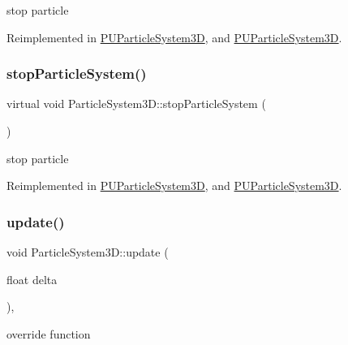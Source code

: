 stop particle 

Reimplemented in \hyperlink{classPUParticleSystem3D_a95eff5c73f4e750e34b0f1901bfdae3d}{P\+U\+Particle\+System3D}, and \hyperlink{classPUParticleSystem3D_a2fb2d3bfd5bc6b7b827e1800f34f0157}{P\+U\+Particle\+System3D}.

\mbox{\label{classParticleSystem3D_a93d4c960fa9d37cde714c482080dea4e}} 
\subsubsection{\texorpdfstring{stop\+Particle\+System()}{stopParticleSystem()}\hspace{0.1cm}{\footnotesize\ttfamily [2/2]}}
{\footnotesize\ttfamily virtual void Particle\+System3\+D\+::stop\+Particle\+System (\begin{DoxyParamCaption}{ }\end{DoxyParamCaption})\hspace{0.3cm}{\ttfamily [virtual]}}

stop particle 

Reimplemented in \hyperlink{classPUParticleSystem3D_a95eff5c73f4e750e34b0f1901bfdae3d}{P\+U\+Particle\+System3D}, and \hyperlink{classPUParticleSystem3D_a2fb2d3bfd5bc6b7b827e1800f34f0157}{P\+U\+Particle\+System3D}.

\mbox{\label{classParticleSystem3D_a04fb4f09a517f393b5deb8174b964e40}} 
\subsubsection{\texorpdfstring{update()}{update()}\hspace{0.1cm}{\footnotesize\ttfamily [1/2]}}
{\footnotesize\ttfamily void Particle\+System3\+D\+::update (\begin{DoxyParamCaption}\item[{float}]{delta }\end{DoxyParamCaption})\hspace{0.3cm}{\ttfamily [override]}, {\ttfamily [virtual]}}

override function 

